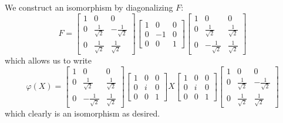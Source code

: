 \answer We construct an isomorphism by diagonalizing $F$:
\begin{equation}
F = \begin{bmatrix} 1&0&0\\
0&\frac{1}{\sqrt{2}}&-\frac{1}{\sqrt{2}}\\
0&\frac{1}{\sqrt{2}}&\frac{1}{\sqrt{2}}
\end{bmatrix}
\begin{bmatrix}
1&0&0\\
0&-1&0\\
0&0&1
\end{bmatrix}
\begin{bmatrix} 1&0&0\\
0&\frac{1}{\sqrt{2}}&\frac{1}{\sqrt{2}}\\
0&-\frac{1}{\sqrt{2}}&\frac{1}{\sqrt{2}}
\end{bmatrix}
\end{equation}
which allows us to write
\begin{equation}
\varphi(X)=\begin{bmatrix} 1&0&0\\
0&\frac{1}{\sqrt{2}}&\frac{1}{\sqrt{2}}\\
0&-\frac{1}{\sqrt{2}}&\frac{1}{\sqrt{2}}
\end{bmatrix}
\begin{bmatrix}1&0&0\\
0&i&0\\
0&0&1\end{bmatrix}X
\begin{bmatrix}1&0&0\\
0&i&0\\
0&0&1\end{bmatrix}\begin{bmatrix} 1&0&0\\
0&\frac{1}{\sqrt{2}}&-\frac{1}{\sqrt{2}}\\
0&\frac{1}{\sqrt{2}}&\frac{1}{\sqrt{2}}
\end{bmatrix}
\end{equation}
which clearly is an isomorphism as desired.

